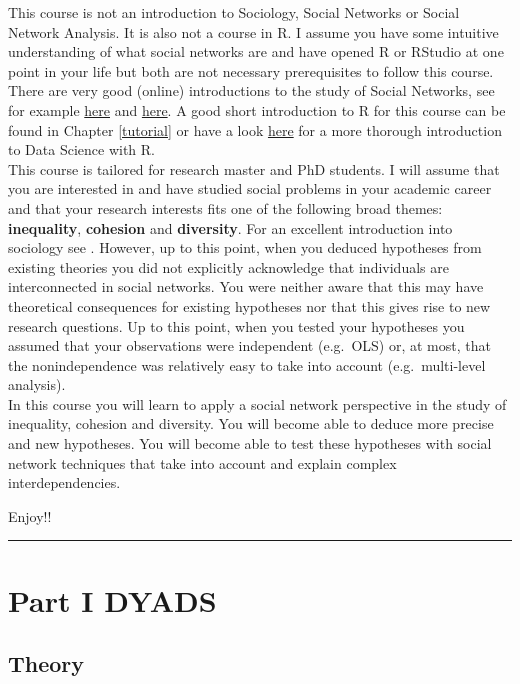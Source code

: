 \documentclass[
]{book}
\begin{document}
This course is not an introduction to Sociology, Social Networks or Social Network Analysis. It is also not a course in R. I assume you have some intuitive understanding of what social networks are and have opened R or RStudio at one point in your life but both are not necessary prerequisites to follow this course. There are very good (online) introductions to the study of Social Networks, see for example \href{https://bookdown.org/markhoff/social_network_analysis/}{here} and \href{https://eehh-stanford.github.io/SNA-workshop/}{here}. A good short introduction to R for this course can be found in Chapter \ref{tutorial} or have a look \href{https://rafalab.github.io/dsbook/}{here} for a more thorough introduction to Data Science with R.\\
This course is tailored for research master and PhD students. I will assume that you are interested in and have studied social problems in your academic career and that your research interests fits one of the following broad themes: \textbf{inequality}, \textbf{cohesion} and \textbf{diversity}. For an excellent introduction into sociology see \citep{Tubergen2020}. However, up to this point, when you deduced hypotheses from existing theories you did not explicitly acknowledge that individuals are interconnected in social networks. You were neither aware that this may have theoretical consequences for existing hypotheses nor that this gives rise to new research questions. Up to this point, when you tested your hypotheses you assumed that your observations were independent (e.g.~OLS) or, at most, that the nonindependence was relatively easy to take into account (e.g.~multi-level analysis).\\
In this course you will learn to apply a social network perspective in the study of inequality, cohesion and diversity. You will become able to deduce more precise and new hypotheses. You will become able to test these hypotheses with social network techniques that take into account and explain complex interdependencies.

Enjoy!!

\begin{center}\rule{0.5\linewidth}{0.5pt}\end{center}

\hypertarget{part-part-i-dyads}{%
\part{Part I DYADS}\label{part-part-i-dyads}}

\hypertarget{theory}{%
\chapter{Theory}\label{theory}}
\end{document}
